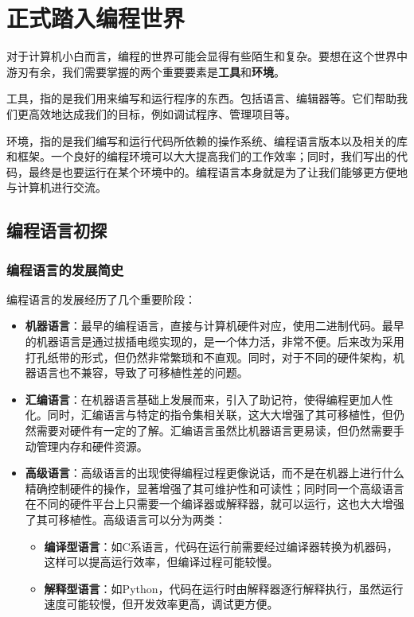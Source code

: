 \documentclass[../main.tex]{subfiles}
\begin{document}
\chapter{正式踏入编程世界}

对于计算机小白而言，编程的世界可能会显得有些陌生和复杂。要想在这个世界中游刃有余，我们需要掌握的两个重要要素是\textbf{工具}和\textbf{环境}。

工具，指的是我们用来编写和运行程序的东西。包括语言、编辑器等。它们帮助我们更高效地达成我们的目标，例如调试程序、管理项目等。

环境，指的是我们编写和运行代码所依赖的操作系统、编程语言版本以及相关的库和框架。一个良好的编程环境可以大大提高我们的工作效率；同时，我们写出的代码，最终是也要运行在某个环境中的。编程语言本身就是为了让我们能够更方便地与计算机进行交流。

\section{编程语言初探}

\subsection{编程语言的发展简史}

编程语言的发展经历了几个重要阶段：

\begin{itemize}
  \item \textbf{机器语言}：最早的编程语言，直接与计算机硬件对应，使用二进制代码。最早的机器语言是通过拔插电缆实现的，是一个体力活，非常不便。后来改为采用打孔纸带的形式，但仍然非常繁琐和不直观。同时，对于不同的硬件架构，机器语言也不兼容，导致了可移植性差的问题。
  \item \textbf{汇编语言}：在机器语言基础上发展而来，引入了助记符，使得编程更加人性化。同时，汇编语言与特定的指令集相关联，这大大增强了其可移植性，但仍然需要对硬件有一定的了解。汇编语言虽然比机器语言更易读，但仍然需要手动管理内存和硬件资源。
  \item \textbf{高级语言}：高级语言的出现使得编程过程更像说话，而不是在机器上进行什么精确控制硬件的操作，显著增强了其可维护性和可读性；同时同一个高级语言在不同的硬件平台上只需要一个编译器或解释器，就可以运行，这也大大增强了其可移植性。高级语言可以分为两类：
        \begin{itemize}
          \item \textbf{编译型语言}：如C系语言，代码在运行前需要经过编译器转换为机器码，这样可以提高运行效率，但编译过程可能较慢。
          \item \textbf{解释型语言}：如Python，代码在运行时由解释器逐行解释执行，虽然运行速度可能较慢，但开发效率更高，调试更方便。
        \end{itemize}
\end{itemize}
\end{document}

